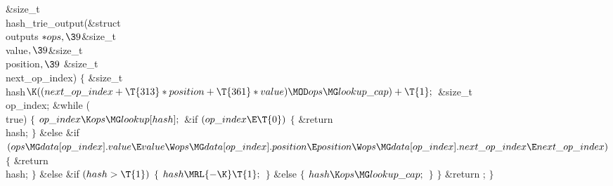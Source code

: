 \Y\B\1\1\&{size\_t} \\{hash\_trie\_output}(\&{struct} \\{outputs} ${}{*}%
\\{ops},\39{}$\&{size\_t} \\{value}${},\39{}$\&{size\_t} \\{position}${},\39{}$%
\&{size\_t} \\{next\_op\_index})\2\2\6
${}\{{}$\1\6
\&{size\_t} \\{hash}${}\K((\\{next\_op\_index}+\T{313}*\\{position}+\T{361}*%
\\{value})\MOD\\{ops}\MG\\{lookup\_cap})+\T{1};{}$\6
\&{size\_t} \\{op\_index};\7
\&{while} (\\{true})\5
${}\{{}$\1\6
${}\\{op\_index}\K\\{ops}\MG\\{lookup}[\\{hash}];{}$\6
\&{if} ${}(\\{op\_index}\E\T{0}){}$\5
${}\{{}$\1\6
\&{return} \\{hash};\6
\4${}\}{}$\2\6
\&{else} \&{if} ${}(\\{ops}\MG\\{data}[\\{op\_index}].\\{value}\E\\{value}\W%
\\{ops}\MG\\{data}[\\{op\_index}].\\{position}\E\\{position}\W\\{ops}\MG%
\\{data}[\\{op\_index}].\\{next\_op\_index}\E\\{next\_op\_index}){}$\5
${}\{{}$\1\6
\&{return} \\{hash};\6
\4${}\}{}$\2\6
\&{else} \&{if} ${}(\\{hash}>\T{1}){}$\5
${}\{{}$\1\6
${}\\{hash}\MRL{-{\K}}\T{1};{}$\6
\4${}\}{}$\2\6
\&{else}\5
${}\{{}$\1\6
${}\\{hash}\K\\{ops}\MG\\{lookup\_cap};{}$\6
\4${}\}{}$\2\6
\4${}\}{}$\2\6
\&{return} ;\6
\4${}\}{}$\2\par
\fi


